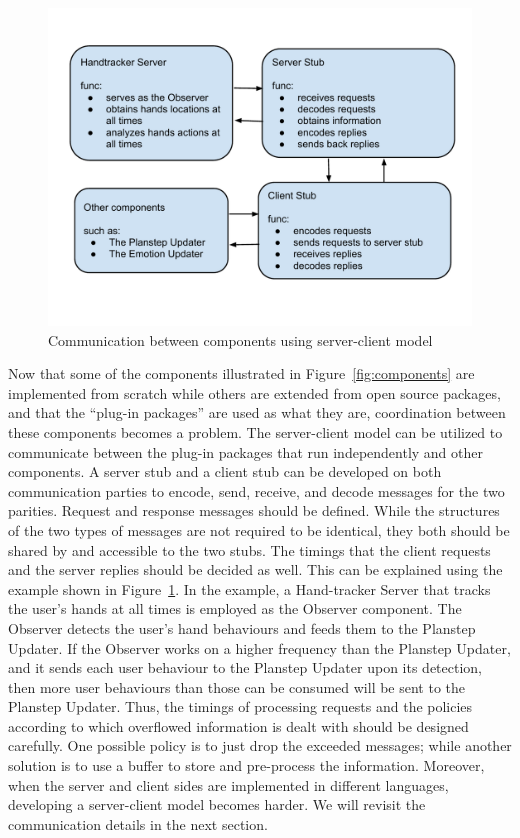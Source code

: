 \begin{figure}[p]
\centering
\includegraphics[width=\linewidth]{fig-communication.pdf}
\caption{Communication between components using server-client model}
\label{fig:communication}
\end{figure}

Now that some of the components illustrated in Figure~\ref{fig:components} are implemented from scratch while others are extended from open source packages, and that the ``plug-in packages'' are used as what they are, coordination between these components becomes a problem. The server-client model can be utilized to communicate between the plug-in packages that run independently and other components. A server stub and a client stub can be developed on both communication parties to encode, send, receive, and decode messages for the two parities. Request and response messages should be defined. While the structures of the two types of messages are not required to be identical, they both should be shared by and accessible to the two stubs. The timings that the client requests and the server replies should be decided as well. This can be explained using the example shown in Figure~\ref{fig:communication}. In the example, a Hand-tracker Server that tracks the user's hands at all times is employed as the Observer component. The Observer detects the user's hand behaviours and feeds them to the Planstep Updater. If the Observer works on a higher frequency than the Planstep Updater, and it sends each user behaviour to the Planstep Updater upon its detection, then more user behaviours than those can be consumed will be sent to the Planstep Updater. Thus, the timings of processing requests and the policies according to which overflowed information is dealt with should be designed carefully. One possible policy is to just drop the exceeded messages; while another solution is to use a buffer to store and pre-process the information. Moreover, when the server and client sides are implemented in different languages, developing a server-client model becomes harder. We will revisit the communication details in the next section.

